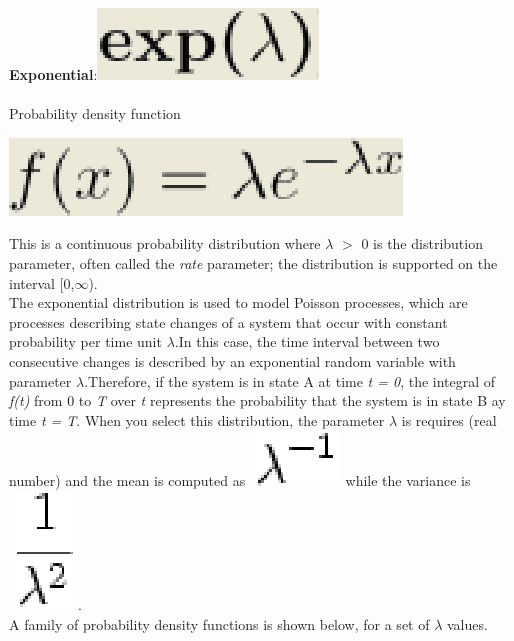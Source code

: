 \textbf{Exponential}:\includegraphics[scale=.5]{img/jsim/exponential_f.eps}\\\\
Probability density function\\
\begin{center}
\includegraphics[scale=.5]{img/jsim/exponential1.eps}
\end{center}
This is a continuous probability distribution where $\lambda$ $>$ 0 is the distribution parameter, often called the \emph{rate} parameter; the distribution is supported on the interval [0,$\infty$).\\
The exponential distribution is used to model Poisson  processes, which are processes describing state changes of a system that occur  with constant probability per time unit $\lambda$.In this case, the time interval between two consecutive changes is  described by an exponential random variable with parameter $\lambda$.Therefore, if the system is in state A at time \emph{t = 0}, the integral of \emph{f(t)} from 0 to \emph{T} over \emph{t} represents the  probability that the system is in state B ay time \emph{t = T}. When you select this distribution, the parameter $\lambda$ is requires (real number) and the mean is computed as \includegraphics[scale=.3]{img/jsim/exponential2.eps} while the variance is \includegraphics[scale=.3]{img/jsim/expo_var.eps}.\\
A family of probability density functions is shown below, for a set of $\lambda$ values.\\
